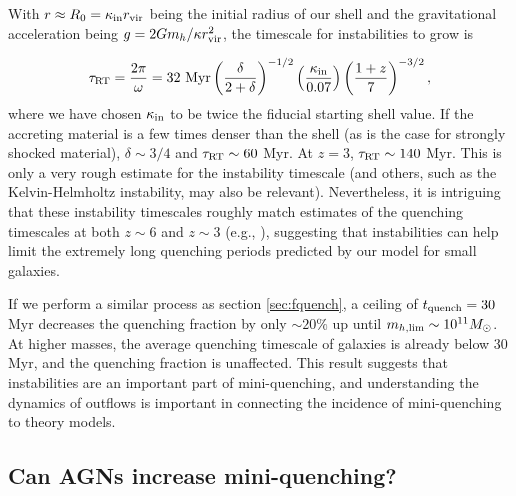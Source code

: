 \documentclass[a4paper,11pt]{article}
\begin{document}
With $r \approx R_{0} = \kappa_{\rm in} r_{\rm vir}$ being the initial radius of our shell and the gravitational acceleration being $g = 2Gm_{h}/\kappa r_{\rm vir}^{2}$, the timescale for instabilities to grow is

\begin{equation}
    \tau_{\rm RT} = \frac{2 \pi}{\omega} = 32 \ \mathrm{Myr} \left( \frac{\delta}{2 + \delta} \right)^{-1/2}\left( \frac{\kappa_{\rm in}}{0.07} \right) \left( \frac{1 + z}{7} \right)^{-3/2},
\end{equation}
%
where we have chosen $\kappa_{\rm in}$ to be twice the fiducial starting shell value.
If the accreting material is a few times denser than the shell (as is the case for strongly shocked material), $\delta \sim 3/4$ and $\tau_{\rm RT} \sim 60$ Myr. At $z = 3$, $\tau_{\rm RT} \sim 140$ Myr. This is only a very rough estimate for the instability timescale (and others, such as the Kelvin-Helmholtz instability, may also be relevant). Nevertheless, it is intriguing that these instability timescales roughly match estimates of the quenching timescales at both $z \sim 6$ and $z \sim 3$ (e.g., \cite{Covelo-Paz2026, Merlin2025}), suggesting that instabilities can help limit the extremely long quenching periods predicted by our model for small galaxies. 

If we perform a similar process as section \ref{sec:fquench}, a ceiling of $t_{\rm quench} = 30$ Myr decreases the quenching fraction by only $\sim 20 \%$ up until $m_{h, \rm lim} \sim 10^{11} M_{\odot}$. At higher masses, the average quenching timescale of galaxies is already below 30 Myr, and the quenching fraction is unaffected. This result suggests that instabilities are an important part of mini-quenching, and understanding the dynamics of outflows is important in connecting the incidence of mini-quenching to theory models.

\subsection{Can AGNs increase mini-quenching?}
\end{document}
